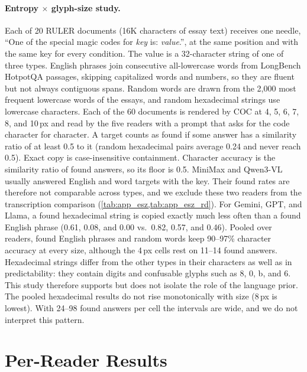 \paragraph{Entropy $\times$ glyph-size study.}
Each of 20 RULER documents (16K characters of essay text) receives one needle, ``One of the special magic codes for \emph{key} is: \emph{value}.'', at the same position and with the same key for every condition.
The value is a 32-character string of one of three types.
English phrases join consecutive all-lowercase words from LongBench HotpotQA passages, skipping capitalized words and numbers, so they are fluent but not always contiguous spans.
Random words are drawn from the 2{,}000 most frequent lowercase words of the essays, and random hexadecimal strings use lowercase characters.
Each of the 60 documents is rendered by COC at 4, 5, 6, 7, 8, and 10\,px and read by the five readers with a prompt that asks for the code character for character.
A target counts as found if some answer has a similarity ratio of at least 0.5 to it (random hexadecimal pairs average 0.24 and never reach 0.5). Exact copy is case-insensitive containment. Character accuracy is the similarity ratio of found answers, so its floor is 0.5.
MiniMax and Qwen3-VL usually answered English and word targets with the key. Their found rates are therefore not comparable across types, and we exclude these two readers from the transcription comparison (\cref{tab:app_esz,tab:app_esz_rd}).
For Gemini, GPT, and Llama, a found hexadecimal string is copied exactly much less often than a found English phrase (0.61, 0.08, and 0.00 vs.\ 0.82, 0.57, and 0.46).
Pooled over readers, found English phrases and random words keep 90--97\% character accuracy at every size, although the 4\,px cells rest on 11--14 found answers.
Hexadecimal strings differ from the other types in their characters as well as in predictability: they contain digits and confusable glyphs such as 8, 0, b, and 6. This study therefore supports but does not isolate the role of the language prior.
The pooled hexadecimal results do not rise monotonically with size (8\,px is lowest). With 24--98 found answers per cell the intervals are wide, and we do not interpret this pattern.




\section{Per-Reader Results}
\label{app:tables}

